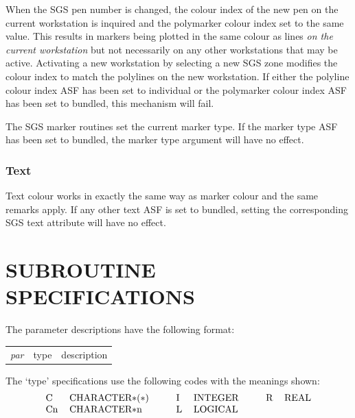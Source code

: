 \documentclass[11pt]{article}
\newenvironment{latexonly}{}{}
\begin{document}
When the SGS pen number is changed, the colour index of the new pen on the
current workstation is inquired and the polymarker colour index set to the same
value.
This results in markers being plotted in the same colour as lines {\em on the
current workstation}\/ but not necessarily on any other workstations that may be
active.
Activating a new workstation by selecting a new SGS zone modifies the colour
index to match the polylines on the new workstation.
If either the polyline colour index ASF has been set to individual or the
polymarker colour index ASF has been set to bundled, this mechanism will fail.

The SGS marker routines set the current marker type.
If the marker type ASF has been set to bundled, the marker type argument will
have no effect.

\subsubsection* {Text}

Text colour works in exactly the same way as marker colour and the same remarks
apply.
If any other text ASF is set to bundled, setting the corresponding SGS text
attribute will have no effect.

\section {SUBROUTINE SPECIFICATIONS}\label{app-subroutines}

\begin{latexonly}
The parameter descriptions have the following format:

\begin{tabular}{lll}
\em par&type&description
\end{tabular}

The `type' specifications use the following codes with the meanings shown:
\[\begin{tabular}{ll@{\hspace{1cm}}ll@{\hspace{1cm}}ll}
C&CHARACTER$\ast$($\ast$)&I&INTEGER&R&REAL\\
Cn&CHARACTER$\ast$n&L&LOGICAL
\end{tabular}\]
\end{latexonly}

\newcommand{\rthead}[2]{\rule{\textwidth}{0.3mm}
{\Large {\bf #1} \hfill #2 \hfill {\bf #1}}}
\newenvironment{params}%
{\[\begin{tabular}{p{0.14\textwidth}p{0.05\textwidth}p{0.66\textwidth}}}%
{\end{tabular}\]}
\newcommand{\rparams}[3]{{\em #1} &#2 &#3\\}
\end{document}
